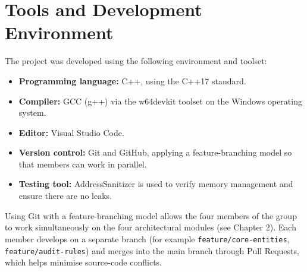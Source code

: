 \section{Tools and Development Environment}
    The project was developed using the following environment and toolset:
    \begin{itemize}
        \item \textbf{Programming language:} C++, using the C++17 standard.
        \item \textbf{Compiler:} GCC (g++) via the w64devkit toolset on the Windows operating system.
        \item \textbf{Editor:} Visual Studio Code.
        \item \textbf{Version control:} Git and GitHub, applying a feature-branching model so that members can work in parallel.
        \item \textbf{Testing tool:} AddressSanitizer is used to verify memory management and ensure there are no leaks.
    \end{itemize}

    Using Git with a feature-branching model allows the four members of the group to work simultaneously on the four architectural modules (see Chapter 2). Each member develops on a separate branch (for example \texttt{feature/core-entities}, \texttt{feature/audit-rules}) and merges into the main branch through Pull Requests, which helps minimise source-code conflicts.
